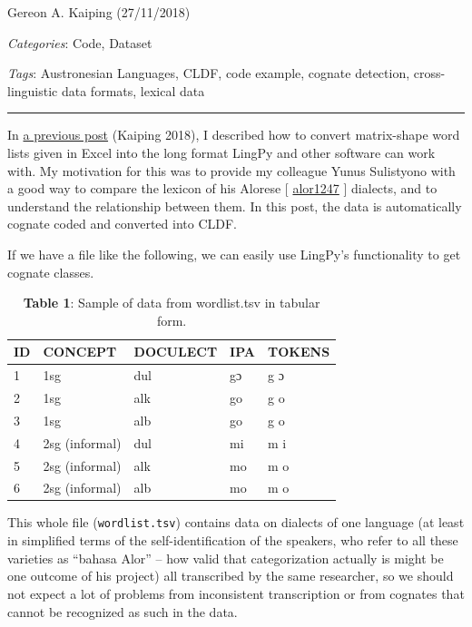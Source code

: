 \documentclass[
  a4paper,
  14pt,
  oneside,
  tablecaptionabove
]{scrbook}
\begin{document}
Gereon A. Kaiping (27/11/2018)

\emph{Categories}: Code, Dataset

\emph{Tags}: Austronesian Languages, CLDF, code example, cognate
detection, cross-linguistic data formats, lexical data

\begin{center}\rule{0.5\linewidth}{1pt}\end{center}

In \href{https://calc.hypotheses.org/803}{a previous post} (Kaiping
2018), I described how to convert matrix-shape word lists given in Excel
into the long format LingPy and other software can work with. My
motivation for this was to provide my colleague Yunus Sulistyono with a
good way to compare the lexicon of his Alorese {[}
\href{https://glottolog.org/resource/languoid/id/alor1247}{alor1247} {]}
dialects, and to understand the relationship between them. In this post,
the data is automatically cognate coded and converted into CLDF.

If we have a file like the following, we can easily use LingPy's
functionality to get cognate classes.

\begin{table}[h]
\centering
\begin{tabular}{@{}lllll@{}}
\toprule
ID & CONCEPT        & DOCULECT & IPA & TOKENS \\ \midrule
1  & 1sg            & dul      & gɔ  & g ɔ    \\
2  & 1sg            & alk      & go  & g o    \\
3  & 1sg            & alb      & go  & g o    \\
4  & 2sg (informal) & dul      & mi  & m i    \\
5  & 2sg (informal) & alk      & mo  & m o    \\
6  & 2sg (informal) & alb      & mo  & m o    \\ \bottomrule
\end{tabular}
\caption*{\small \textbf{Table 1}: Sample of data from wordlist.tsv in tabular form.}
\label{tab:my-table}
\end{table}
 
This whole file (\lstinline!wordlist.tsv!) contains
data on dialects of one language (at least in simplified terms of the
self-identification of the speakers, who refer to all these varieties as
\enquote{bahasa Alor} -- how valid that categorization actually is might
be one outcome of his project) all transcribed by the same researcher,
so we should not expect a lot of problems from inconsistent
transcription or from cognates that cannot be recognized as such in the
data.
\end{document}
